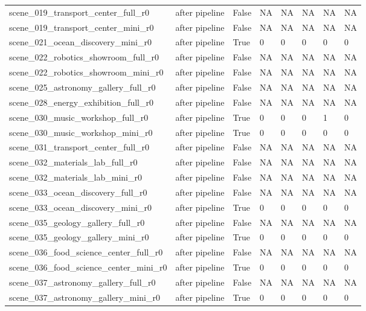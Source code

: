 \begin{tabular}{llllllll}
scene\_019\_transport\_center\_full\_r0 & after pipeline & False & NA & NA & NA & NA & NA \\
scene\_019\_transport\_center\_mini\_r0 & after pipeline & False & NA & NA & NA & NA & NA \\
scene\_021\_ocean\_discovery\_mini\_r0 & after pipeline & True & 0 & 0 & 0 & 0 & 0 \\
scene\_022\_robotics\_showroom\_full\_r0 & after pipeline & False & NA & NA & NA & NA & NA \\
scene\_022\_robotics\_showroom\_mini\_r0 & after pipeline & False & NA & NA & NA & NA & NA \\
scene\_025\_astronomy\_gallery\_full\_r0 & after pipeline & False & NA & NA & NA & NA & NA \\
scene\_028\_energy\_exhibition\_full\_r0 & after pipeline & False & NA & NA & NA & NA & NA \\
scene\_030\_music\_workshop\_full\_r0 & after pipeline & True & 0 & 0 & 0 & 1 & 0 \\
scene\_030\_music\_workshop\_mini\_r0 & after pipeline & True & 0 & 0 & 0 & 0 & 0 \\
scene\_031\_transport\_center\_full\_r0 & after pipeline & False & NA & NA & NA & NA & NA \\
scene\_032\_materials\_lab\_full\_r0 & after pipeline & False & NA & NA & NA & NA & NA \\
scene\_032\_materials\_lab\_mini\_r0 & after pipeline & False & NA & NA & NA & NA & NA \\
scene\_033\_ocean\_discovery\_full\_r0 & after pipeline & False & NA & NA & NA & NA & NA \\
scene\_033\_ocean\_discovery\_mini\_r0 & after pipeline & True & 0 & 0 & 0 & 0 & 0 \\
scene\_035\_geology\_gallery\_full\_r0 & after pipeline & False & NA & NA & NA & NA & NA \\
scene\_035\_geology\_gallery\_mini\_r0 & after pipeline & True & 0 & 0 & 0 & 0 & 0 \\
scene\_036\_food\_science\_center\_full\_r0 & after pipeline & False & NA & NA & NA & NA & NA \\
scene\_036\_food\_science\_center\_mini\_r0 & after pipeline & True & 0 & 0 & 0 & 0 & 0 \\
scene\_037\_astronomy\_gallery\_full\_r0 & after pipeline & False & NA & NA & NA & NA & NA \\
scene\_037\_astronomy\_gallery\_mini\_r0 & after pipeline & True & 0 & 0 & 0 & 0 & 0 \\

\end{tabular}
